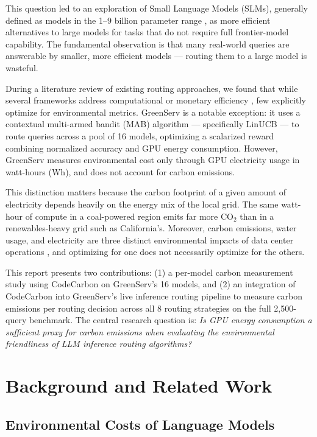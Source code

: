 \documentclass[12pt]{article}
\begin{document}
This question led to an exploration of Small Language Models (SLMs),
generally defined as models in the 1--9 billion parameter range
\cite{gupta2026}, as more efficient alternatives to large models for tasks
that do not require full frontier-model capability. The fundamental
observation is that many real-world queries are answerable by smaller, more
efficient models --- routing them to a large model is wasteful.

During a literature review of existing routing approaches, we found that
while several frameworks address computational or monetary efficiency
\cite{chen2023frugalgpt, routellm2024}, few explicitly optimize for
environmental metrics. GreenServ \cite{ziller2026} is a notable exception:
it uses a contextual multi-armed bandit (MAB) algorithm --- specifically
LinUCB \cite{li2010contextual} --- to route queries across a pool of 16
models, optimizing a scalarized reward combining normalized accuracy and GPU
energy consumption. However, GreenServ measures environmental cost only
through GPU electricity usage in watt-hours (Wh), and does not account for
carbon emissions.

This distinction matters because the carbon footprint of a given amount of
electricity depends heavily on the energy mix of the local grid. The same
watt-hour of compute in a coal-powered region emits far more CO$_2$ than in
a renewables-heavy grid such as California's. Moreover, carbon emissions,
water usage, and electricity are three distinct environmental impacts of data
center operations \cite{luccioni2023}, and optimizing for one does not
necessarily optimize for the others.

This report presents two contributions: (1) a per-model carbon measurement
study using CodeCarbon \cite{codecarbon2023} on GreenServ's 16 models, and
(2) an integration of CodeCarbon into GreenServ's live inference routing
pipeline to measure carbon emissions per routing decision across all 8
routing strategies on the full 2,500-query benchmark. The central research
question is: \textit{Is GPU energy consumption a sufficient proxy for carbon
emissions when evaluating the environmental friendliness of LLM inference
routing algorithms?}

\section{Background and Related Work}

\subsection{Environmental Costs of Language Models}
\end{document}
